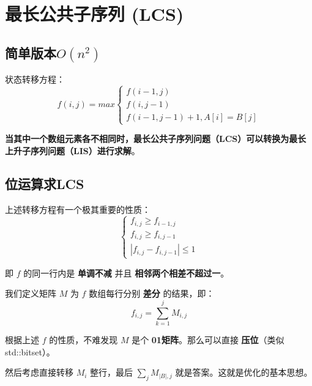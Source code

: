 \section{最长公共子序列 (LCS)}
\subsection{简单版本$O(n^2)$}
\par \noindent 状态转移方程：
$$
f(i, j) = max\begin{cases} f(i-1, j)\\ f(i, j-1) \\ f(i-1, j-1) + 1, A[i] = B[j] \end{cases}
$$
\par \noindent \textbf{当其中一个数组元素各不相同时，最长公共子序列问题（LCS）可以转换为最长上升子序列问题（LIS）进行求解}。
\subsection{位运算求LCS}

\par \noindent 上述转移方程有一个极其重要的性质：    
$$
\begin{cases}
f_{i,j} \ge f_{i-1,j} \\
f_{i,j} \ge f_{i,j-1} \\
|f_{i,j} - f_{i,j-1}| \le 1
\end{cases}
$$

\par \noindent 即 $f$ 的同一行内是 \textbf{单调不减} 并且 \textbf{相邻两个相差不超过一}。
~\\
\par \noindent 我们定义矩阵 $M$ 为 $f$ 数组每行分别 \textbf{差分} 的结果，即：
$$
f_{i,j} = \sum_{k=1}^j M_{i,j}
$$
\par \noindent 根据上述 $f$ 的性质，不难发现 $M$ 是个 \textbf{01矩阵}。那么可以直接 \textbf{压位}（类似 std::bitset）。
~\\
\par \noindent 然后考虑直接转移 $M_i$ 整行，最后 $\sum_{j}M_{|B|,j}$ 就是答案。这就是优化的基本思想。

